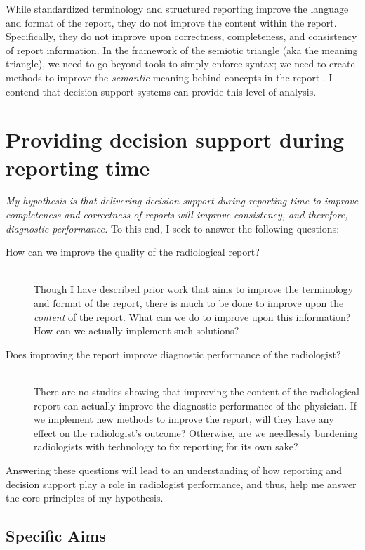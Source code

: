 While standardized terminology and structured reporting improve the language and format of the report, they do not improve the content within the report.
Specifically, they do not improve upon correctness, completeness, and consistency of report information.
In the framework of the semiotic triangle (aka the meaning triangle), we need to go beyond tools to simply enforce syntax; we need to create methods to improve the \emph{semantic} meaning behind concepts in the report \cite{Mead:2006wm}.
I contend that decision support systems can provide this level of analysis. 


\section{Providing decision support during reporting time}

\emph{My hypothesis is that delivering decision support during reporting time to improve completeness and correctness of reports will improve consistency, and therefore, diagnostic performance.} To this end, I seek to answer the following questions:

\begin{description}
	\item[How can we improve the quality of the radiological report?] \hfill \\
	Though I have described prior work that aims to improve the terminology and format of the report, there is much to be done to improve upon the \emph{content} of the report. What can we do to improve upon this information? How can we actually implement such solutions?
	
	\item[Does improving the report improve diagnostic performance of the radiologist?] \hfill \\
	There are no studies showing that improving the content of the radiological report can actually improve the diagnostic performance of the physician. If we implement new methods to improve the report, will they have any effect on the radiologist's outcome? Otherwise, are we needlessly burdening radiologists with technology to fix reporting for its own sake?
\end{description}

Answering these questions will lead to an understanding of how reporting and decision support play a role in radiologist performance, and thus, help me answer the core principles of my hypothesis.

\subsection{Specific Aims}


